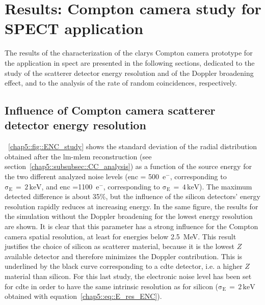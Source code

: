 \section{Results: Compton camera study for SPECT application}\label{chap5::sec::Results_CC_SPECT}
The results of the characterization of the \gls{clarys} Compton camera prototype for the application in \gls{spect} are presented in the following sections, dedicated to the study of the scatterer detector energy resolution and of the Doppler broadening effect, and to the analysis of the rate of random coincidences, respectively.

\subsection{Influence of Compton camera scatterer detector energy resolution}\label{chap5::subsec::Results_CC_SPECT_ENC}
\figurename~\ref{chap5::fig::ENC_study} shows the standard deviation of the radial distribution obtained after the \gls{lm-mlem} reconstruction (see section~\ref{chap5::subsubsec::CC_analysis}) as a function of the source energy for the two different analyzed noise levels (\gls{enc} = 500~e$^-$, corresponding to $\mathrm{\sigma_{E}\,=\,2\,keV}$, and \gls{enc} =1100~e$^-$, corresponding to $\mathrm{\sigma_{E}\,=\,4\,keV}$). The maximum detected difference is about 35\%, but the influence of the silicon detectors' energy resolution rapidly reduces at increasing energy. In the same figure, the results for the simulation without the Doppler broadening for the lowest energy resolution are shown. It is clear that this parameter has a strong influence for the Compton camera spatial resolution, at least for energies below 2.5~MeV. This result justifies the choice of silicon as scatterer material, because it is the lowest $Z$ available detector and therefore minimizes the Doppler contribution. This is underlined by the black curve corresponding to a \gls{cdte} detector, i.e. a higher $Z$ material than silicon. For this last study, the electronic noise level has been set for \gls{cdte} in order to have the same intrinsic resolution as for silicon ($\mathrm{\sigma_{E}\,=\,2\,keV}$ obtained with equation~\ref{chap5::eq::E_res_ENC}).

